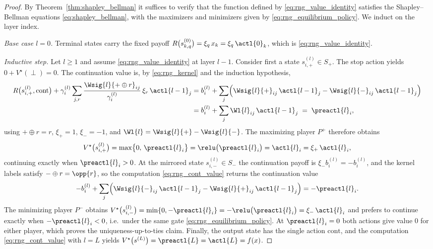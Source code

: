 \begin{proof}
By Theorem~\ref{thm:shapley_bellman} it suffices to verify that the function defined by \eqref{eq:rng_value_identity} satisfies the Shapley--Bellman equations \eqref{eq:shapley_bellman}, with the maximizers and minimizers given by \eqref{eq:rng_equilibrium_policy}. We induct on the layer index.

\emph{Base case $l = 0$.} Terminal states carry the fixed payoff $R\bigl(s^{(0)}_{k,q}\bigr) = \xi_q\, x_k = \xi_q\, \actl{0}_k$, which is \eqref{eq:rng_value_identity}.

\emph{Inductive step.} Let $l \ge 1$ and assume \eqref{eq:rng_value_identity} at layer $l - 1$. Consider first a state $s^{(l)}_{i,+} \in S_{+}$. The stop action yields $0 + V^{\star}(\perp) = 0$. The continuation value is, by \eqref{eq:rng_kernel} and the induction hypothesis,
\begin{align}
	R\bigl(s^{(l)}_{i,+}, \mathrm{cont}\bigr) + \gamma^{(l)}_i \sum_{j, r} \frac{\Wsig{l}{+ \oplus r}_{ij}}{\gamma^{(l)}_i}\, \xi_{r}\, \actl{l-1}_j
	&= b^{(l)}_i + \sum_{j} \Bigl( \Wsig{l}{+}_{ij}\, \actl{l-1}_j - \Wsig{l}{-}_{ij}\, \actl{l-1}_j \Bigr) \notag\\
	&= b^{(l)}_i + \sum_j \Wl{l}_{ij}\, \actl{l-1}_j
	\;=\; \preactl{l}_i,
	\label{eq:rng_cont_value}
\end{align}
using $+ \oplus r = r$, $\xi_{+} = 1$, $\xi_{-} = -1$, and $\Wl{l} = \Wsig{l}{+} - \Wsig{l}{-}$. The maximizing player $P^{+}$ therefore obtains
\begin{equation*}
	V^{\star}\bigl(s^{(l)}_{i,+}\bigr) = \max\bigl\{ 0,\, \preactl{l}_i \bigr\} = \relu\bigl(\preactl{l}_i\bigr) = \actl{l}_i = \xi_{+}\, \actl{l}_i,
\end{equation*}
continuing exactly when $\preactl{l}_i > 0$. At the mirrored state $s^{(l)}_{i,-} \in S_{-}$ the continuation payoff is $\xi_{-} b^{(l)}_i = -b^{(l)}_i$, and the kernel labels satisfy $- \oplus r = \opp{r}$, so the computation \eqref{eq:rng_cont_value} returns the continuation value
\begin{equation*}
	-b^{(l)}_i + \sum_{j} \Bigl( \Wsig{l}{-}_{ij}\, \actl{l-1}_j - \Wsig{l}{+}_{ij}\, \actl{l-1}_j \Bigr)
	= -\preactl{l}_i .
\end{equation*}
The minimizing player $P^{-}$ obtains $V^{\star}\bigl(s^{(l)}_{i,-}\bigr) = \min\{0, -\preactl{l}_i\} = -\relu\bigl(\preactl{l}_i\bigr) = \xi_{-}\, \actl{l}_i$ and prefers to continue exactly when $-\preactl{l}_i < 0$, i.e.\ under the same gate \eqref{eq:rng_equilibrium_policy}. At $\preactl{l}_i = 0$ both actions give value $0$ for either player, which proves the uniqueness-up-to-ties claim. Finally, the output state has the single action $\mathrm{cont}$, and the computation \eqref{eq:rng_cont_value} with $l = L$ yields $V^{\star}\bigl(s^{(L)}\bigr) = \preactl{L} = \actl{L} = f(x)$.
\end{proof}

